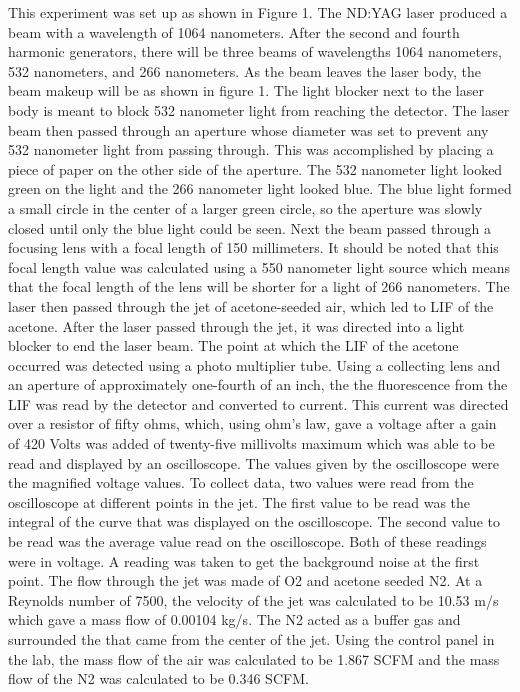 \documentclass{article}
\begin{document}
This experiment was set up as shown in Figure 1.  The ND:YAG laser produced a beam with a wavelength of 1064 nanometers.  After the second and fourth harmonic generators, there will be three beams of wavelengths 1064 nanometers, 532 nanometers, and 266 nanometers.  As the beam leaves the laser body, the beam makeup will be as shown in figure 1.  The light blocker next to the laser body is meant to block 532 nanometer light from reaching the detector.  The laser beam then passed through an aperture whose diameter was set to prevent any 532 nanometer light from passing through.  This was accomplished by placing a piece of paper on the other side of the aperture.  The 532 nanometer light looked green on the light and the 266 nanometer light looked blue.  The blue light formed a small circle in the center of a larger green circle, so the aperture was slowly closed until only the blue light could be seen.  Next the beam passed through a focusing lens with a focal length of 150 millimeters.  It should be noted that this focal length value was calculated using a 550 nanometer light source which means that the focal length of the lens will be shorter for a light of 266 nanometers.  The laser then passed through the jet of acetone-seeded air, which led to LIF of the acetone.  After the laser passed through the jet, it was directed into a light blocker to end the laser beam.  \newline
\indent The point at which the LIF of the acetone occurred was detected using a photo multiplier tube.  Using a collecting lens and an aperture of approximately one-fourth of an inch, the the fluorescence from the LIF was read by the detector and converted to current.  This current was directed over a resistor of fifty ohms, which, using ohm's law, gave a voltage after a gain of 420 Volts was added of twenty-five millivolts maximum which was able to be read and displayed by an oscilloscope. The values given by the oscilloscope were the magnified voltage values.\newline
\indent To collect data, two values were read from the oscilloscope at different points in the jet.  The first value to be read was the integral of the curve that was displayed on the oscilloscope.  The second value to be read was the average value read on the oscilloscope.  Both of these readings were in voltage. A reading was taken to get the background noise at the first point.\newline
\indent The flow through the jet was made of O2 and acetone seeded N2.  At a Reynolds number of 7500, the velocity of the jet was calculated to be 10.53 m/s which gave a mass flow of 0.00104 kg/s.  The N2 acted as a buffer gas and surrounded the that came from the center of the jet.  Using the control panel in the lab, the mass flow of the air was calculated to be 1.867 SCFM and the mass flow of the N2 was calculated to be 0.346 SCFM.  \newline
\end{document}
